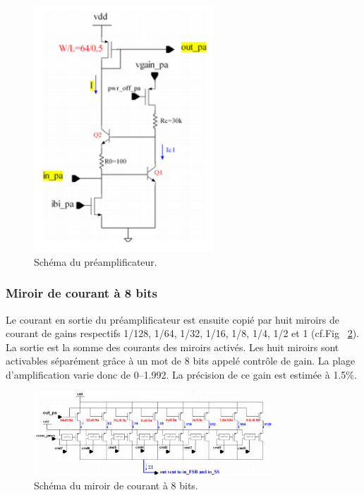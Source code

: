 \begin{figure}[th!]
	\centering
	\includegraphics[width=0.60\textwidth]{GLA/preampli.png}
	\captionsetup{type=figure}\caption{Schéma du préamplificateur.}
	\label{preampli}
\end{figure}

\subsubsection{Miroir de courant à 8 bits}
Le courant en sortie du préamplificateur est ensuite copié par huit miroirs de courant de gains respectifs 1/128, 1/64, 1/32, 1/16, 1/8, 1/4, 1/2 et 1 (cf.Fig~ \ref{mirror}). La sortie est la somme des courants des miroirs activés. Les huit miroirs sont activables séparément grâce à un mot de \num{8} bits appelé contrôle de gain. La plage d'amplification varie donc de \SIrange{0}{1.992}{}. La précision de ce gain est estimée à 1.5\%. 

\begin{figure}[ht!]
	\centering
	\includegraphics[width=0.8\textwidth]{GLA/miror.png}
	\captionsetup{type=figure}\caption{Schéma du miroir de courant à \num{8} bits.}
	\label{mirror}
\end{figure}

